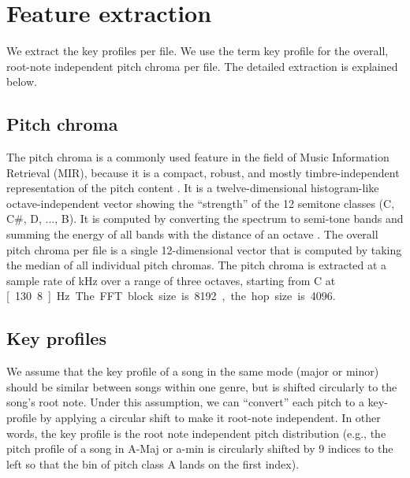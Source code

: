 \documentclass{article}
\begin{document}
\section{Feature extraction}\label{sec:pitch_chroma}
We extract the key profiles per file. We use the term key profile for the overall, root-note independent pitch chroma per file. The detailed extraction is explained below.

\subsection{Pitch chroma}\label{subsec:pc_extract}
The pitch chroma is a commonly used feature in the field of Music Information Retrieval (MIR), because it is a compact, robust, and mostly timbre-independent representation of the pitch content  \cite{muller_information_2007}. It is a twelve-dimensional histogram-like octave-independent vector showing the ``strength'' of the 12 semitone classes (C, C\#, D, ..., B). It is computed by converting the spectrum to semi-tone bands and summing the energy of all bands with the distance of an octave \cite{fujishima_realtime_1999}. 
The overall pitch chroma per file is a single 12-dimensional vector that is computed by taking the median of all individual pitch chromas. 
The pitch chroma is extracted at a sample rate of \unit[10]{kHz} over a range of three octaves, starting from C at \unit[130.8]{Hz}. The FFT block size is 8192, the hop size is 4096.



\subsection{Key profiles}\label{sec:featureset}
We assume that the key profile of a song in the same mode (major or minor) should be similar between songs within one genre, but is shifted circularly to the song's root note. Under this assumption, we can ``convert'' each pitch to a key-profile by applying a circular shift to make it root-note independent. In other words, the key profile is the root note independent pitch distribution (e.g., the pitch profile of a song in A-Maj or a-min is circularly shifted by $9$ indices to the left so that the bin of pitch class A lands on the first index).
\end{document}
